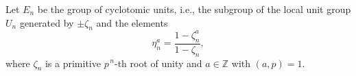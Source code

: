Let $E_n$ be the group of cyclotomic units, i.e., the subgroup of the local unit group $U_n$ generated by $\pm \zeta_n$ and the elements
$$\eta_n^{a} = \frac{1 - \zeta_n^{a}}{1 - \zeta_n},$$
where $\zeta_n$ is a primitive $p^{\,n}$-th root of unity and $a \in \mathbb{Z}$ with $(a, p) = 1$.
